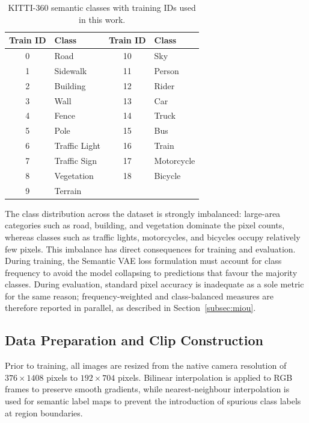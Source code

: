 \begin{table}[t]
    \centering
    \caption{KITTI-360 semantic classes with training IDs used in this work.}
    \label{tab:kitti360_classes}
    \begin{tabular}{clcl}
        \toprule
        \textbf{Train ID} & \textbf{Class} & \textbf{Train ID} & \textbf{Class} \\
        \midrule
        0  & Road         & 10 & Sky \\
        1  & Sidewalk     & 11 & Person \\
        2  & Building     & 12 & Rider \\
        3  & Wall         & 13 & Car \\
        4  & Fence        & 14 & Truck \\
        5  & Pole         & 15 & Bus \\
        6  & Traffic Light & 16 & Train \\
        7  & Traffic Sign & 17 & Motorcycle \\
        8  & Vegetation   & 18 & Bicycle \\
        9  & Terrain      &    & \\
        \bottomrule
    \end{tabular}
\end{table}

The class distribution across the dataset is strongly imbalanced: large-area categories such as road, building, and vegetation dominate the pixel counts, whereas classes such as traffic lights, motorcycles, and bicycles occupy relatively few pixels. This imbalance has direct consequences for training and evaluation. During training, the Semantic VAE loss formulation must account for class frequency to avoid the model collapsing to predictions that favour the majority classes. During evaluation, standard pixel accuracy is inadequate as a sole metric for the same reason; frequency-weighted and class-balanced measures are therefore reported in parallel, as described in Section~\ref{subsec:miou}.

\subsection{Data Preparation and Clip Construction}
\label{subsec:data_preparation}

Prior to training, all images are resized from the native camera resolution of $376 \times 1408$ pixels to $192 \times 704$ pixels. Bilinear interpolation is applied to RGB frames to preserve smooth gradients, while nearest-neighbour interpolation is used for semantic label maps to prevent the introduction of spurious class labels at region boundaries.

